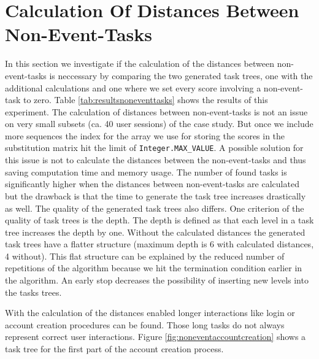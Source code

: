 \section{Calculation Of Distances Between Non-Event-Tasks}
\label{sec:noneventtasks}
In this section we investigate if the calculation of the distances between non-event-tasks is neccessary by comparing the two generated task trees, one with the additional calculations and one where
we set every score involving a non-event-task to zero. 
Table \ref{tab:resultsnoneventtasks} shows the results of this experiment.
The calculation of distances between non-event-tasks is not an issue on very small subsets (ca. 40 user sessions) of the case study. 
But once we include more sequences the index for the array we use for storing the scores in the substitution matrix hit the limit of \texttt{Integer.MAX\_VALUE}.
A possible solution for this issue is not to calculate the distances between the non-event-tasks and thus saving computation time and memory usage.
The number of found tasks is significantly higher when the distances between non-event-tasks are calculated but the drawback is that the time to generate the task tree increases drastically as well.
The quality of the generated task trees also differs.
One criterion of the quality of task trees is the depth. 
The depth is defined as that each level in a task tree increases the depth by one.
Without the calculated distances the generated task trees have a flatter structure (maximum depth is 6 with calculated distances, 4 without).
This flat structure can be explained by the reduced number of repetitions of the algorithm because we hit the termination condition earlier in the algorithm.
An early stop decreases the possibility of inserting new levels into the tasks trees.

With the calculation of the distances enabled longer interactions like login or account creation procedures can be found.
Those long tasks do not always represent correct user interactions.
Figure \ref{fig:noneventaccountcreation} shows a task tree for the first part of the account creation process.

